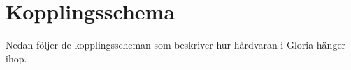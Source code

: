 \section{Kopplingsschema}

Nedan följer de kopplingsscheman som beskriver hur hårdvaran i Gloria hänger ihop.

